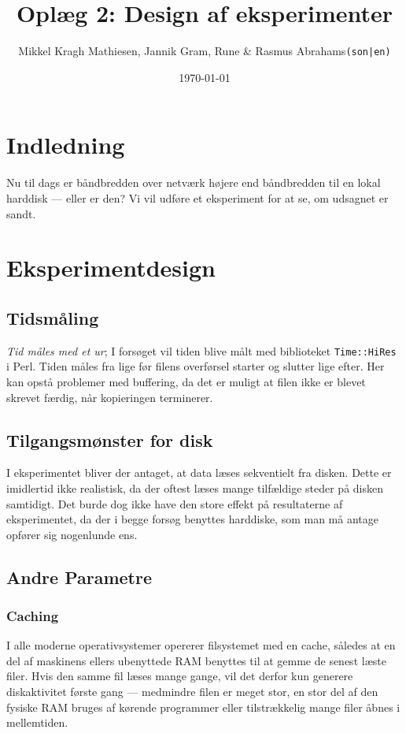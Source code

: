 \documentclass{article}
\author{Mikkel Kragh Mathiesen, Jannik Gram, Rune \& Rasmus Abrahams{\tt (son|en)}}
\title{Oplæg 2: Design af eksperimenter}
\date{\today}
\begin{document}
\maketitle

\tableofcontents

\newpage

\section{Indledning}
Nu til dags er båndbredden over netværk højere end båndbredden til en lokal harddisk --- eller er den? Vi vil udføre et eksperiment for at se, om udsagnet er sandt.

\section{Eksperimentdesign}

\subsection{Tidsmåling}
\textit{Tid måles med et ur}; I forsøget vil tiden blive målt med biblioteket {\tt Time::HiRes} i Perl. Tiden måles fra lige før filens overførsel starter og slutter lige efter. Her kan opstå problemer med buffering, da det er muligt at filen ikke er blevet skrevet færdig, når kopieringen terminerer.

\subsection{Tilgangsmønster for disk}
I eksperimentet bliver der antaget, at data læses sekventielt fra disken. Dette er imidlertid ikke realistisk, da der oftest læses mange tilfældige steder på disken samtidigt. Det burde dog ikke have den store effekt på resultaterne af eksperimentet, da der i begge forsøg benyttes harddiske, som man må antage opfører sig nogenlunde ens.

\subsection{Andre Parametre}
\subsubsection{Caching}
I alle moderne operativsystemer opererer filsystemet med en cache, således at en del af maskinens ellers ubenyttede RAM benyttes til at gemme de senest læste filer. Hvis den samme fil læses mange gange, vil det derfor kun generere diskaktivitet første gang --- medmindre filen er meget stor, en stor del af den fysiske RAM bruges af kørende programmer eller tilstrækkelig mange filer åbnes i mellemtiden.
\end{document}
